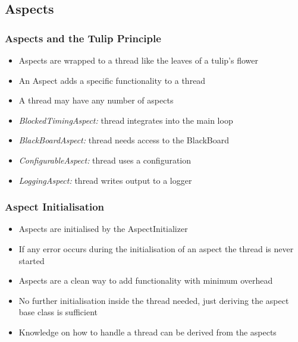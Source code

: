 \subsection{Aspects}
\begin{frame}
  \frametitle{Aspects and the Tulip Principle}
  \begin{itemize}
  \item<1-> Aspects are wrapped to a thread like the leaves of a tulip's flower
  \item<2-> An Aspect adds a specific functionality to a thread
  \item<2-> A thread may have any number of aspects
  \end{itemize}
  \begin{itemize}
  \item<3-> \emph{BlockedTimingAspect:} thread integrates into the main loop
  \item<3-> \emph{BlackBoardAspect:} thread needs access to the BlackBoard
  \item<3-> \emph{ConfigurableAspect:} thread uses a configuration
  \item<3-> \emph{LoggingAspect:} thread writes output to a logger
  \end{itemize}
\end{frame}

\begin{frame}
  \frametitle{Aspect Initialisation}
  \begin{itemize}
  \item Aspects are initialised by the AspectInitializer
  \item If any error occurs during the initialisation of an aspect the thread
    is never started
  \item Aspects are a clean way to add functionality with minimum overhead
  \item No further initialisation inside the thread needed, just deriving
    the aspect base class is sufficient
  \item Knowledge on how to handle a thread can be derived from the aspects
  \end{itemize}
\end{frame}

